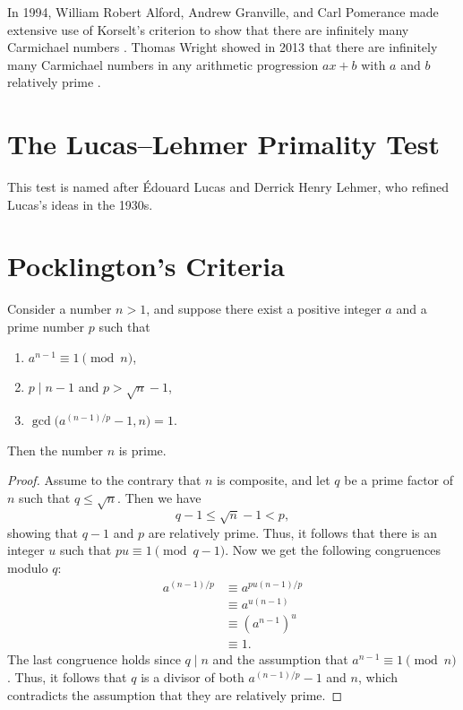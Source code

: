In 1994, William Robert Alford, Andrew Granville, and Carl Pomerance made extensive use of Korselt's criterion to show that there are infinitely many Carmichael numbers \cite{alfordea1994}. Thomas Wright showed in 2013 that there are infinitely many Carmichael numbers in any arithmetic progression $ax+b$ with $a$ and $b$ relatively prime \cite{wright2013}.

\section{The Lucas--Lehmer Primality Test}

This test is named after \'Edouard Lucas and Derrick Henry Lehmer, who refined Lucas's ideas in the 1930s. 

\section{Pocklington's Criteria}

\begin{theorem}
  Consider a number $n>1$, and suppose there exist a positive integer $a$ and a prime number $p$ such that
  \begin{enumerate}
  \item $a^{n-1}\equiv 1\pmod{n}$,
  \item $p\mid n-1$ and $p>\sqrt{n}-1$,
  \item $\gcd\big(a^{(n-1)/p}-1,n\big)=1$.
  \end{enumerate}
  Then the number $n$ is prime.
\end{theorem}

\begin{proof}
  Assume to the contrary that $n$ is composite, and let $q$ be a prime factor of $n$ such that $q\leq \sqrt{n}$. Then we have
  \begin{equation*}
    q-1\leq \sqrt{n}-1<p,
  \end{equation*}
  showing that $q-1$ and $p$ are relatively prime. Thus, it follows that there is an integer $u$ such that $pu\equiv 1\pmod{q-1}$. Now we get the following congruences modulo $q$:
  \begin{align*}
    a^{(n-1)/p} & \equiv a^{pu(n-1)/p} \\
                & \equiv a^{u(n-1)} \\
                & \equiv (a^{n-1})^u \\
                & \equiv 1.
  \end{align*}
  The last congruence holds since $q\mid n$ and the assumption that $a^{n-1}\equiv 1\pmod{n}$. Thus, it follows that $q$ is a divisor of both $a^{(n-1)/p}-1$ and $n$, which contradicts the assumption that they are relatively prime.
\end{proof}

